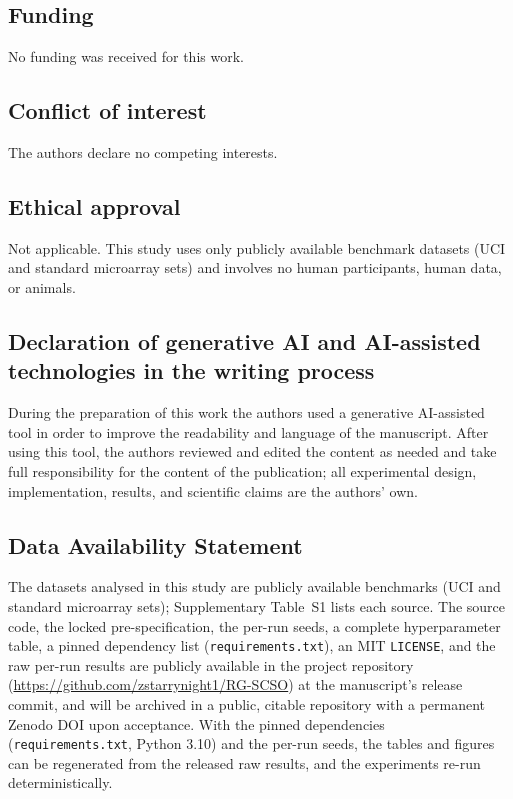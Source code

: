 \documentclass[preprint,3p,times]{elsarticle}
\begin{document}
\subsection*{Funding}
No funding was received for this work.

\subsection*{Conflict of interest}
The authors declare no competing interests.

\subsection*{Ethical approval}
Not applicable. This study uses only publicly available benchmark datasets
(UCI and standard microarray sets) and involves no human participants,
human data, or animals.

\subsection*{Declaration of generative AI and AI-assisted technologies in the writing process}
During the preparation of this work the authors used a generative
AI-assisted tool in order to improve the readability and
language of the manuscript. After using this tool, the authors reviewed
and edited the content as needed and take full responsibility for the content of
the publication; all experimental design, implementation, results, and
scientific claims are the authors' own.

\subsection*{Data Availability Statement}
The datasets analysed in this study are publicly available benchmarks (UCI
and standard microarray sets); Supplementary Table~S1 lists each source. The
source code, the locked pre-specification, the per-run seeds, a complete
hyperparameter table, a pinned dependency list (\texttt{requirements.txt}),
an MIT \texttt{LICENSE}, and the raw per-run results are publicly available
in the project repository (\url{https://github.com/zstarrynight1/RG-SCSO})
at the manuscript's release commit, and will be archived in a public, citable
repository with a permanent Zenodo DOI upon acceptance. With the pinned
dependencies (\texttt{requirements.txt}, Python 3.10) and the per-run seeds,
the tables and figures can be regenerated from the released raw results, and
the experiments re-run deterministically.




\end{document}
